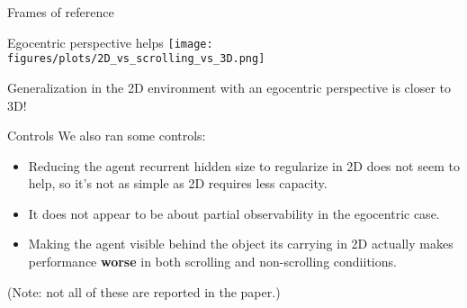 \documentclass{beamer}
\begin{document}
\begin{frame}{Frames of reference}
\end{frame}

\begin{frame}{Egocentric perspective helps}
\vspace{1em}
\centering
\texttt{[image: figures/plots/2D\_vs\_scrolling\_vs\_3D.png]}
\end{frame}

\begin{frame}[standout]
Generalization in the 2D environment with an egocentric perspective is closer to 3D!
\end{frame}

\begin{frame}{Controls}
We also ran some controls:
\begin{itemize}
\item Reducing the agent recurrent hidden size to regularize in 2D does not seem to help, so it's not as simple as 2D requires less capacity. 
\item It does not appear to be about partial observability in the egocentric case.
\item Making the agent visible behind the object its carrying in 2D actually makes performance \textbf{worse} in both scrolling and non-scrolling condiitions.
\end{itemize}
(Note: not all of these are reported in the paper.)
\end{frame}
\end{document}
